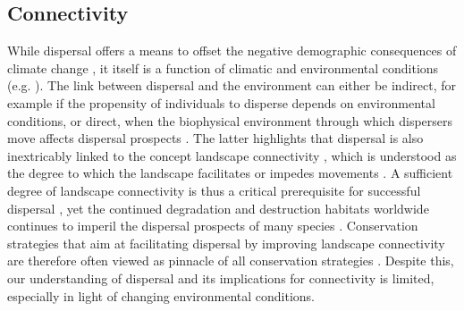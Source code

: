 \documentclass[abstract=on,10pt,a4paper,bibliography=totocnumbered]{article}
\begin{document}
\subsection{Connectivity}
While dispersal offers a means to offset the negative demographic consequences
of climate change \citep{Kokko.2006, Hodgson.2009, Travis.2013}, it itself is a
function of climatic and environmental conditions (e.g. \citealp{Elliot.2014,
 Behr.2020}). The link between dispersal and the environment can either be
indirect, for example if the propensity of individuals to disperse depends on
environmental conditions, or direct, when the biophysical environment through
which dispersers move affects dispersal prospects \citep{Travis.2013}. The
latter highlights that dispersal is also inextricably linked to the concept
landscape connectivity \citep{Baguette.2013}, which is understood as the degree
to which the landscape facilitates or impedes movements \citep{Taylor.1993}. A
sufficient degree of landscape connectivity is thus a critical prerequisite for
successful dispersal \citep{Fahrig.2003}, yet the continued degradation and
destruction habitats worldwide continues to imperil the dispersal prospects of
many species \citep{Melbourne.2008, Sawyer.2011}. Conservation strategies that
aim at facilitating dispersal by improving landscape connectivity are therefore
often viewed as pinnacle of all conservation strategies \citep{Heller.2009}.
Despite this, our understanding of dispersal and its implications for
connectivity is limited, especially in light of changing environmental
conditions.
\end{document}
